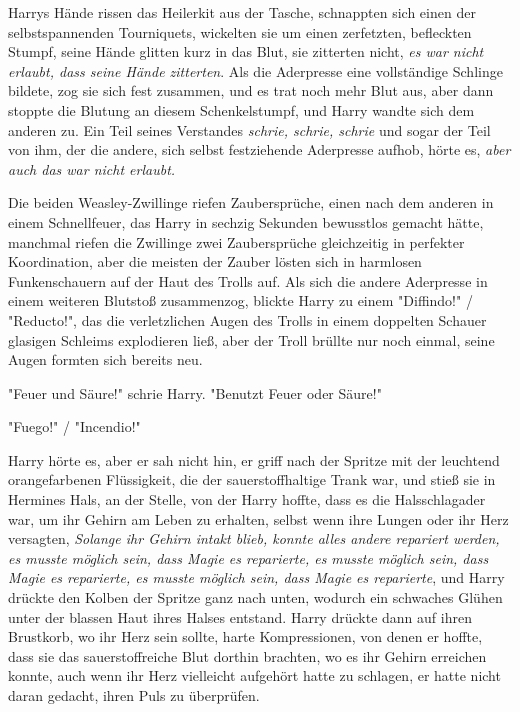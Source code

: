 {Harrys Hände rissen das Heilerkit aus der Tasche, schnappten sich einen der selbstspannenden Tourniquets, wickelten sie um einen zerfetzten, befleckten Stumpf, seine Hände glitten kurz in das Blut, sie zitterten nicht, \emph{es war nicht erlaubt, dass seine Hände zitterten}. Als die Aderpresse eine vollständige Schlinge bildete, zog sie sich fest zusammen, und es trat noch mehr Blut aus, aber dann stoppte die Blutung an diesem Schenkelstumpf, und Harry wandte sich dem anderen zu. Ein Teil seines Verstandes \emph{schrie, schrie, schrie} und sogar der Teil von ihm, der die andere, sich selbst festziehende Aderpresse aufhob, hörte es, \emph{aber auch das war nicht erlaubt.}

Die beiden Weasley-Zwillinge riefen Zaubersprüche, einen nach dem anderen in einem Schnellfeuer, das Harry in sechzig Sekunden bewusstlos gemacht hätte, manchmal riefen die Zwillinge zwei Zaubersprüche gleichzeitig in perfekter Koordination, aber die meisten der Zauber lösten sich in harmlosen Funkenschauern auf der Haut des Trolls auf. Als sich die andere Aderpresse in einem weiteren Blutstoß zusammenzog, blickte Harry zu einem "Diffindo!" / "Reducto!", das die verletzlichen Augen des Trolls in einem doppelten Schauer glasigen Schleims explodieren ließ, aber der Troll brüllte nur noch einmal, seine Augen formten sich bereits neu.

"Feuer und Säure!" schrie Harry. "Benutzt Feuer oder Säure!"

"Fuego!" / "Incendio!"

Harry hörte es, aber er sah nicht hin, er griff nach der Spritze mit der leuchtend orangefarbenen Flüssigkeit, die der sauerstoffhaltige Trank war, und stieß sie in Hermines Hals, an der Stelle, von der Harry hoffte, dass es die Halsschlagader war, um ihr Gehirn am Leben zu erhalten, selbst wenn ihre Lungen oder ihr Herz versagten, \emph{Solange ihr Gehirn intakt blieb, konnte alles andere repariert werden, es musste möglich sein, dass Magie es reparierte, es musste möglich sein, dass Magie es reparierte, es musste möglich sein, dass Magie es reparierte}, und Harry drückte den Kolben der Spritze ganz nach unten, wodurch ein schwaches Glühen unter der blassen Haut ihres Halses entstand. Harry drückte dann auf ihren Brustkorb, wo ihr Herz sein sollte, harte Kompressionen, von denen er hoffte, dass sie das sauerstoffreiche Blut dorthin brachten, wo es ihr Gehirn erreichen konnte, auch wenn ihr Herz vielleicht aufgehört hatte zu schlagen, er hatte nicht daran gedacht, ihren Puls zu überprüfen.

}
